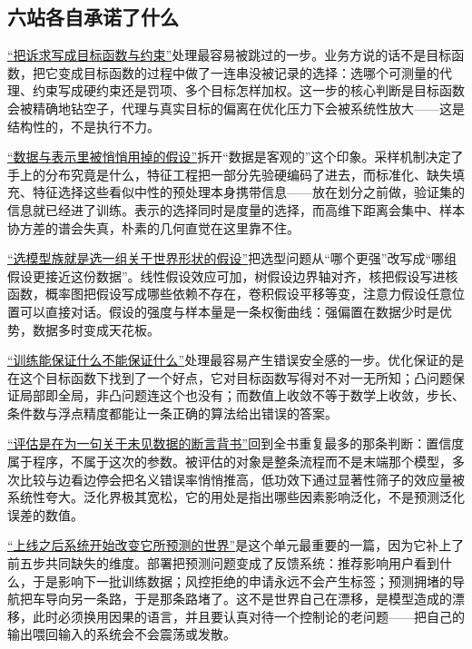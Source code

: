 \subsection{六站各自承诺了什么}

\hyperref[sec:18-Synthesis/01-System-Lifecycle/01]{``把诉求写成目标函数与约束''}处理最容易被跳过的一步。业务方说的话不是目标函数，把它变成目标函数的过程中做了一连串没被记录的选择：选哪个可测量的代理、约束写成硬约束还是罚项、多个目标怎样加权。这一步的核心判断是目标函数会被精确地钻空子，代理与真实目标的偏离在优化压力下会被系统性放大——这是结构性的，不是执行不力。

\hyperref[sec:18-Synthesis/01-System-Lifecycle/02]{``数据与表示里被悄悄用掉的假设''}拆开``数据是客观的''这个印象。采样机制决定了手上的分布究竟是什么，特征工程把一部分先验硬编码了进去，而标准化、缺失填充、特征选择这些看似中性的预处理本身携带信息——放在划分之前做，验证集的信息就已经进了训练。表示的选择同时是度量的选择，而高维下距离会集中、样本协方差的谱会失真，朴素的几何直觉在这里靠不住。

\hyperref[sec:18-Synthesis/01-System-Lifecycle/03]{``选模型族就是选一组关于世界形状的假设''}把选型问题从``哪个更强''改写成``哪组假设更接近这份数据''。线性假设效应可加，树假设边界轴对齐，核把假设写进核函数，概率图把假设写成哪些依赖不存在，卷积假设平移等变，注意力假设任意位置可以直接对话。假设的强度与样本量是一条权衡曲线：强偏置在数据少时是优势，数据多时变成天花板。

\hyperref[sec:18-Synthesis/01-System-Lifecycle/04]{``训练能保证什么不能保证什么''}处理最容易产生错误安全感的一步。优化保证的是在这个目标函数下找到了一个好点，它对目标函数写得对不对一无所知；凸问题保证局部即全局，非凸问题连这个也没有；而数值上收敛不等于数学上收敛，步长、条件数与浮点精度都能让一条正确的算法给出错误的答案。

\hyperref[sec:18-Synthesis/01-System-Lifecycle/05]{``评估是在为一句关于未见数据的断言背书''}回到全书重复最多的那条判断：置信度属于程序，不属于这次的参数。被评估的对象是整条流程而不是末端那个模型，多次比较与边看边停会把名义错误率悄悄推高，低功效下通过显著性筛子的效应量被系统性夸大。泛化界极其宽松，它的用处是指出哪些因素影响泛化，不是预测泛化误差的数值。

\hyperref[sec:18-Synthesis/01-System-Lifecycle/06]{``上线之后系统开始改变它所预测的世界''}是这个单元最重要的一篇，因为它补上了前五步共同缺失的维度。部署把预测问题变成了反馈系统：推荐影响用户看到什么，于是影响下一批训练数据；风控拒绝的申请永远不会产生标签；预测拥堵的导航把车导向另一条路，于是那条路堵了。这不是世界自己在漂移，是模型造成的漂移，此时必须换用因果的语言，并且要认真对待一个控制论的老问题——把自己的输出喂回输入的系统会不会震荡或发散。

